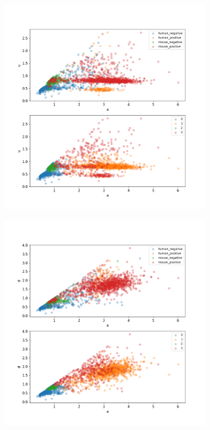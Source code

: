 \begin{figure}
	\centering
	\begin{subfigure}{0.45\textwidth}
		\includegraphics[width=\textwidth]{fig/seperate_a_u}
	\end{subfigure}
	\hfill
	\begin{subfigure}{0.45\textwidth}
		\includegraphics[width=\textwidth]{fig/seperate_a_d}

\end{subfigure}
\end{figure}
